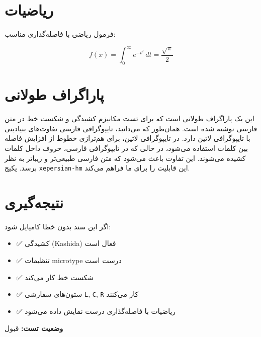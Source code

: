 \documentclass{matinbook}
\begin{document}
\section{ریاضیات}
\label{sec:math}

فرمول ریاضی با فاصله‌گذاری مناسب:

\begin{equation}
    \label{eq:typography-test}
    f(x) = \int_{0}^{\infty} e^{-t^2} \, dt = \frac{\sqrt{\pi}}{2}
\end{equation}

\section{پاراگراف طولانی}
\label{sec:long-paragraph}

این یک پاراگراف طولانی است که برای تست مکانیزم کشیدگی و شکست خط در متن فارسی نوشته شده است. همان‌طور که می‌دانید، تایپوگرافی فارسی تفاوت‌های بنیادینی با تایپوگرافی لاتین دارد. در تایپوگرافی لاتین، برای هم‌ترازی خطوط از افزایش فاصله بین کلمات استفاده می‌شود، در حالی که در تایپوگرافی فارسی، حروف داخل کلمات کشیده می‌شوند. این تفاوت باعث می‌شود که متن فارسی طبیعی‌تر و زیباتر به نظر برسد. پکیج \texttt{xepersian-hm} این قابلیت را برای ما فراهم می‌کند.

\section{نتیجه‌گیری}
\label{sec:conclusion}

اگر این سند بدون خطا کامپایل شود:

\begin{itemize}
    \item ✅ کشیدگی (Kashida) فعال است
    \item ✅ تنظیمات microtype درست است
    \item ✅ شکست خط کار می‌کند
    \item ✅ ستون‌های سفارشی \texttt{L}, \texttt{C}, \texttt{R} کار می‌کنند
    \item ✅ ریاضیات با فاصله‌گذاری درست نمایش داده می‌شود
\end{itemize}

\textbf{وضعیت تست:} قبول
\end{document}
